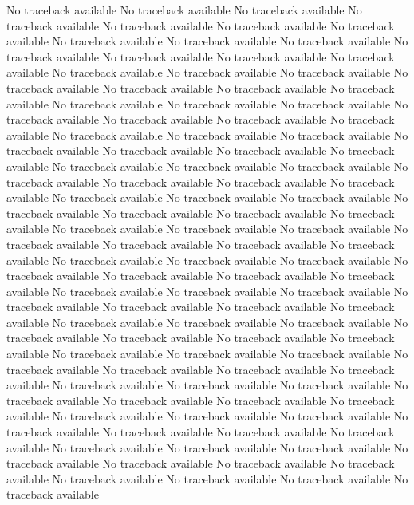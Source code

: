 \documentclass[11pt]{article} %
\begin{document}
\begin{Schunk}
\begin{Soutput}
No traceback available 
No traceback available 
No traceback available 
No traceback available 
No traceback available 
No traceback available 
No traceback available 
No traceback available 
No traceback available 
No traceback available 
No traceback available 
No traceback available 
No traceback available 
No traceback available 
No traceback available 
No traceback available 
No traceback available 
No traceback available 
No traceback available 
No traceback available 
No traceback available 
No traceback available 
No traceback available 
No traceback available 
No traceback available 
No traceback available 
No traceback available 
No traceback available 
No traceback available 
No traceback available 
No traceback available 
No traceback available 
No traceback available 
No traceback available 
No traceback available 
No traceback available 
No traceback available 
No traceback available 
No traceback available 
No traceback available 
No traceback available 
No traceback available 
No traceback available 
No traceback available 
No traceback available 
No traceback available 
No traceback available 
No traceback available 
No traceback available 
No traceback available 
No traceback available 
No traceback available 
No traceback available 
No traceback available 
No traceback available 
No traceback available 
No traceback available 
No traceback available 
No traceback available 
No traceback available 
No traceback available 
No traceback available 
No traceback available 
No traceback available 
No traceback available 
No traceback available 
No traceback available 
No traceback available 
No traceback available 
No traceback available 
No traceback available 
No traceback available 
No traceback available 
No traceback available 
No traceback available 
No traceback available 
No traceback available 
No traceback available 
No traceback available 
No traceback available 
No traceback available 
No traceback available 
No traceback available 
No traceback available 
No traceback available 
No traceback available 
No traceback available 
No traceback available 
No traceback available 
No traceback available 
No traceback available 
No traceback available 
No traceback available 
No traceback available 
No traceback available 
No traceback available 
No traceback available 
No traceback available 
No traceback available 
No traceback available 
No traceback available 
No traceback available 
No traceback available 
No traceback available 
No traceback available 
No traceback available 
No traceback available 
No traceback available 
No traceback available 

\end{Soutput}
\end{Schunk}
\end{document}

